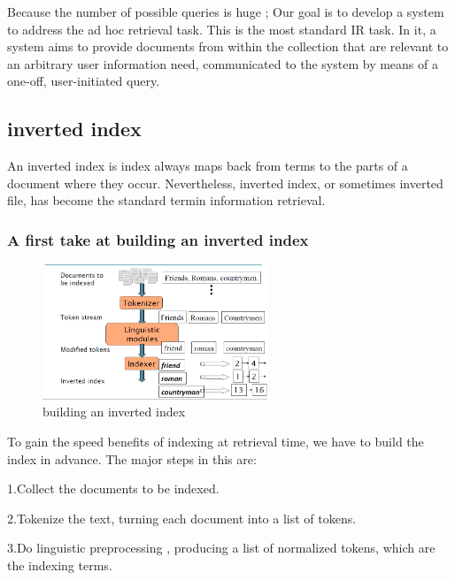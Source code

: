 Because the number of possible queries is huge ; Our goal is to develop a system to address the ad hoc retrieval task. This is the most standard IR task. In it, a system aims to provide documents from within the collection that are relevant to an arbitrary user information need, communicated to the system by means of a one-off, user-initiated query.


\subsection{inverted index}

An inverted index is index always maps back from terms to the parts of a document where they occur. Nevertheless, inverted index, or sometimes inverted file, has become the standard termin information retrieval.
 
\subsubsection{A first take at building an inverted index}

\begin{figure}[H]%
    \center%
    \includegraphics[width=0.6\textwidth]{images/shimaa/building an inverted index.png}
    \caption[An inverted index]{building an inverted index}\label{fig:building an inverted index}%
\end{figure}
 
To gain the speed benefits of indexing at retrieval time, we have to build the
index in advance. The major steps in this are:

1.\hspace{3pt}Collect the documents to be indexed.

2.\hspace{3pt}Tokenize the text, turning each document into a list of tokens.

3.\hspace{3pt}Do linguistic preprocessing , producing a list of normalized tokens, which
  are the indexing terms.
  
